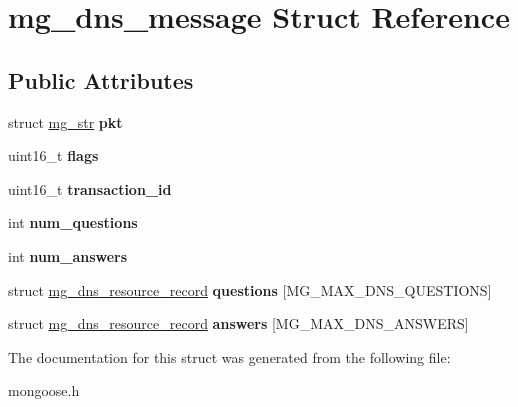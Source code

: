 \hypertarget{structmg__dns__message}{}\section{mg\+\_\+dns\+\_\+message Struct Reference}
\label{structmg__dns__message}
\subsection*{Public Attributes}
\begin{DoxyCompactItemize}
\item 
\mbox{\label{structmg__dns__message_ae8543b2a3044c785b4bf0dc4fc39beff}} 
struct \hyperlink{structmg__str}{mg\+\_\+str} {\bfseries pkt}
\item 
\mbox{\label{structmg__dns__message_a87f916bb55651d46ce74f930a5e08327}} 
uint16\+\_\+t {\bfseries flags}
\item 
\mbox{\label{structmg__dns__message_afb4a01337779347f74a214c7a273ebcb}} 
uint16\+\_\+t {\bfseries transaction\+\_\+id}
\item 
\mbox{\label{structmg__dns__message_a035ced22ef43b6b23ad6df3ad3aad126}} 
int {\bfseries num\+\_\+questions}
\item 
\mbox{\label{structmg__dns__message_a6ebecefbdcb5c292f439123b7c780517}} 
int {\bfseries num\+\_\+answers}
\item 
\mbox{\label{structmg__dns__message_a866a83825f2daa4043aa20acded4f007}} 
struct \hyperlink{structmg__dns__resource__record}{mg\+\_\+dns\+\_\+resource\+\_\+record} {\bfseries questions} \mbox{[}M\+G\+\_\+\+M\+A\+X\+\_\+\+D\+N\+S\+\_\+\+Q\+U\+E\+S\+T\+I\+O\+NS\mbox{]}
\item 
\mbox{\label{structmg__dns__message_a76e7c9d2d5f7f621df2d2551f0163e01}} 
struct \hyperlink{structmg__dns__resource__record}{mg\+\_\+dns\+\_\+resource\+\_\+record} {\bfseries answers} \mbox{[}M\+G\+\_\+\+M\+A\+X\+\_\+\+D\+N\+S\+\_\+\+A\+N\+S\+W\+E\+RS\mbox{]}
\end{DoxyCompactItemize}


The documentation for this struct was generated from the following file\+:\begin{DoxyCompactItemize}
\item 
mongoose.\+h\end{DoxyCompactItemize}
